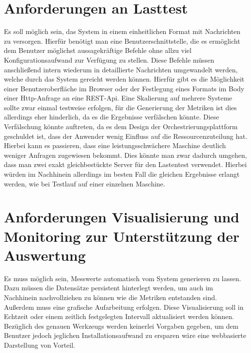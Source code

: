 \section{Anforderungen an Lasttest \checkmark}
Es soll möglich sein, das System in einem einheitlichen Format mit Nachrichten zu versorgen. Hierfür benötigt man eine Benutzerschnittstelle, die es ermöglicht dem Benutzer möglichst aussagekräftige Befehle ohne allzu viel Konfigurationsaufwand zur Verfügung zu stellen. Diese Befehle müssen anschließend intern wiederum in detaillierte Nachrichten umgewandelt werden, welche durch das System gereicht werden können. Hierfür gibt es die Möglichkeit einer Benutzeroberfläche im Browser oder der Festlegung eines Formats im Body einer Http-Anfrage an eine REST-Api. Eine Skalierung auf mehrere Systeme sollte zwar einmal testweise erfolgen, für die Generierung der Metriken ist dies allerdings eher hinderlich, da es die Ergebnisse verfälschen könnte. Diese Verfälschung könnte auftreten, da es dem Design der Orchestrierungsplattform geschuldet ist, dass der Anwender wenig Einfluss auf die Ressourcenzuteilung hat. Hierbei kann es passieren, dass eine leistungsschwächere Maschine deutlich weniger Anfragen zugewiesen bekommt. Dies könnte man zwar dadurch umgehen, dass man zwei exakt gleichbestückte Server für den Lastentest verwendet. Hierbei würden im Nachhinein allerdings im besten Fall die gleichen Ergebnisse erlangt werden, wie bei Testlauf auf einer einzelnen Maschine.

\section{Anforderungen Visualisierung und Monitoring zur Unterstützung der Auswertung \checkmark}
Es muss möglich sein, Messwerte automatisch vom System generieren zu lassen. Dazu müssen die Datensätze persistent hinterlegt werden, um auch im Nachhinein nachvollziehen zu können wie die Metriken entstanden sind. Außerdem muss eine grafische Aufarbeitung erfolgen. Diese Visualisierung soll in Echtzeit oder einem zeitlich festgelegten Intervall aktualisiert werden können. Bezüglich des genauen Werkzeugs werden keinerlei Vorgaben gegeben, um dem Benutzer jedoch jeglichen Installationsaufwand zu ersparen wäre eine webbasierte Darstellung von Vorteil.
